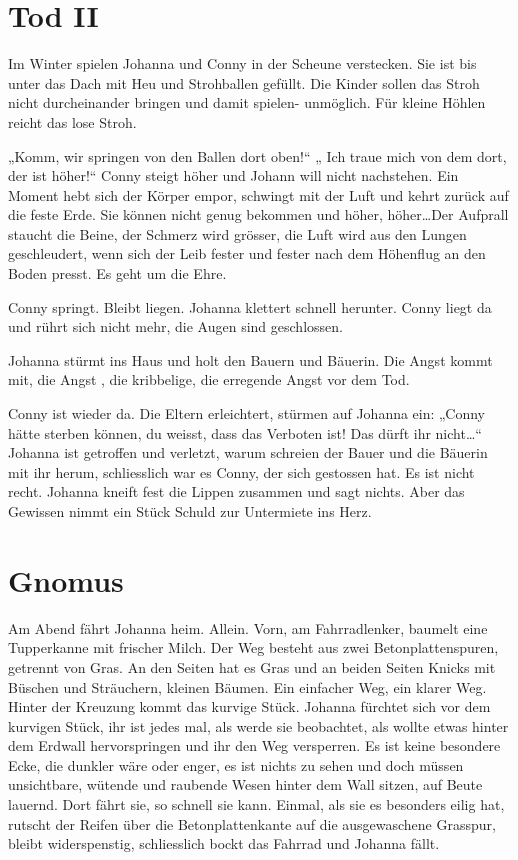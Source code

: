 \documentclass[10pt,a5paper]{book}
\begin{document}
\section*{Tod II}



Im Winter spielen Johanna und Conny in der Scheune verstecken. Sie ist bis unter das Dach mit Heu und Strohballen gefüllt. Die Kinder sollen das Stroh nicht durcheinander bringen und damit spielen- unmöglich. Für kleine Höhlen reicht das lose Stroh.

„Komm, wir springen von den Ballen dort oben!“ „ Ich traue mich von dem dort, der ist höher!“ Conny steigt höher und Johann will nicht nachstehen. Ein Moment hebt sich der Körper empor, schwingt mit der Luft und kehrt zurück auf die feste Erde. Sie können nicht genug bekommen und höher, höher\dots Der Aufprall staucht die Beine, der Schmerz wird grösser, die Luft wird aus den Lungen geschleudert, wenn sich der Leib fester und fester nach dem Höhenflug an den Boden presst. Es geht um die Ehre.

Conny springt. Bleibt liegen. Johanna klettert schnell herunter. Conny liegt da und rührt sich nicht mehr, die Augen sind geschlossen.

Johanna stürmt ins Haus und holt den Bauern und Bäuerin. Die Angst kommt mit, die Angst , die kribbelige, die erregende Angst vor dem Tod.

Conny ist wieder da. Die Eltern erleichtert, stürmen auf Johanna ein: „Conny hätte sterben können, du weisst, dass das Verboten ist! Das dürft ihr nicht\dots“ Johanna ist getroffen und verletzt, warum schreien der Bauer und die Bäuerin mit ihr herum, schliesslich war es Conny, der sich gestossen hat. Es ist nicht recht. Johanna kneift fest die Lippen zusammen und sagt nichts. Aber das Gewissen nimmt ein Stück Schuld zur Untermiete ins Herz.



\section*{Gnomus}



Am Abend fährt Johanna heim. Allein. Vorn, am Fahrradlenker, baumelt eine Tupperkanne mit frischer Milch. Der Weg besteht aus zwei Betonplattenspuren, getrennt von Gras. An den Seiten hat es Gras und an beiden Seiten Knicks mit Büschen und Sträuchern, kleinen Bäumen. Ein einfacher Weg, ein klarer Weg. Hinter der Kreuzung kommt das kurvige Stück. Johanna fürchtet sich vor dem kurvigen Stück, ihr ist jedes mal, als werde sie beobachtet, als wollte etwas hinter dem Erdwall hervorspringen und ihr den Weg versperren. Es ist keine besondere Ecke, die dunkler wäre oder enger, es ist nichts zu sehen und doch müssen unsichtbare, wütende und raubende Wesen hinter dem Wall sitzen, auf Beute lauernd. Dort fährt sie, so schnell sie kann. Einmal, als sie es besonders eilig hat, rutscht der Reifen über die Betonplattenkante auf die ausgewaschene Grasspur, bleibt widerspenstig, schliesslich bockt das Fahrrad und Johanna fällt.
\end{document}
